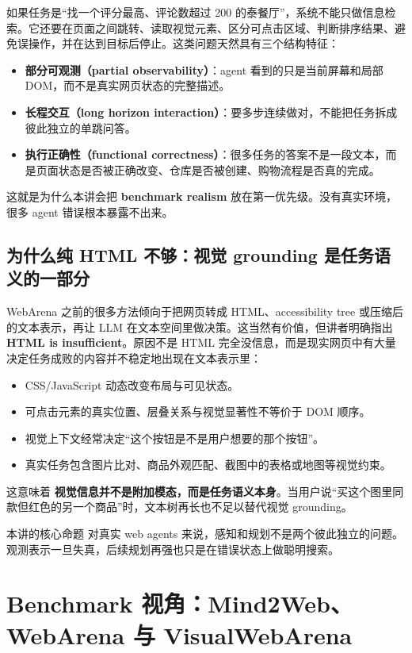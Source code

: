 如果任务是“找一个评分最高、评论数超过 200 的泰餐厅”，系统不能只做信息检索。它还要在页面之间跳转、读取视觉元素、区分可点击区域、判断排序结果、避免误操作，并在达到目标后停止。这类问题天然具有三个结构特征：
\begin{itemize}
\item \textbf{部分可观测（partial observability）}：agent 看到的只是当前屏幕和局部 DOM，而不是真实网页状态的完整描述。
\item \textbf{长程交互（long horizon interaction）}：要多步连续做对，不能把任务拆成彼此独立的单跳问答。
\item \textbf{执行正确性（functional correctness）}：很多任务的答案不是一段文本，而是页面状态是否被正确改变、仓库是否被创建、购物流程是否真的完成。
\end{itemize}

这就是为什么本讲会把 \textbf{benchmark realism} 放在第一优先级。没有真实环境，很多 agent 错误根本暴露不出来。

\subsection{为什么纯 HTML 不够：视觉 grounding 是任务语义的一部分}

WebArena 之前的很多方法倾向于把网页转成 HTML、accessibility tree 或压缩后的文本表示，再让 LLM 在文本空间里做决策。这当然有价值，但讲者明确指出 \textbf{HTML is insufficient}。原因不是 HTML 完全没信息，而是现实网页中有大量决定任务成败的内容并不稳定地出现在文本表示里：
\begin{itemize}
\item CSS/JavaScript 动态改变布局与可见状态。
\item 可点击元素的真实位置、层叠关系与视觉显著性不等价于 DOM 顺序。
\item 视觉上下文经常决定“这个按钮是不是用户想要的那个按钮”。
\item 真实任务包含图片比对、商品外观匹配、截图中的表格或地图等视觉约束。
\end{itemize}

这意味着 \textbf{视觉信息并不是附加模态，而是任务语义本身}。当用户说“买这个图里同款但红色的另一个商品”时，文本树再长也不足以替代视觉 grounding。

\begin{knowledgebox}{本讲的核心命题}
对真实 web agents 来说，感知和规划不是两个彼此独立的问题。观测表示一旦失真，后续规划再强也只是在错误状态上做聪明搜索。
\end{knowledgebox}

\section{Benchmark 视角：Mind2Web、WebArena 与 VisualWebArena}

